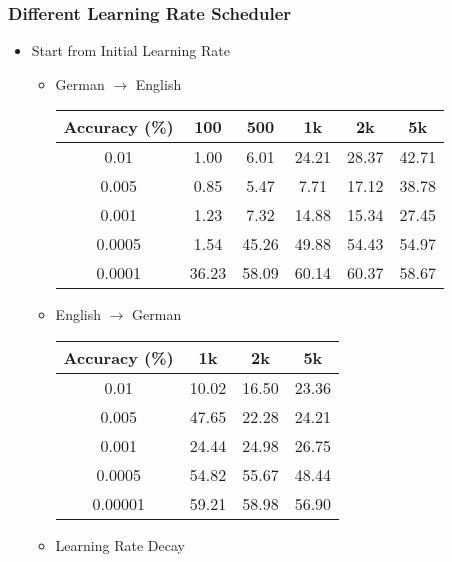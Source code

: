 \subsubsection{Different Learning Rate Scheduler}
\begin{itemize}
	\item Start from Initial Learning Rate
	\begin{itemize}
		\item German $\rightarrow$ English
		\begin{table}[H]
			\centering
			\begin{tabular}{cccccc}
				\hline
				Accuracy (\%) & 100   & 500   & 1k    & 2k    & 5k    \\ \hline
				0.01          & 1.00  & 6.01  & 24.21 & 28.37 & 42.71 \\ \hline
				0.005         & 0.85  & 5.47  & 7.71  & 17.12 & 38.78 \\ \hline
				0.001         & 1.23  & 7.32  & 14.88 & 15.34 & 27.45 \\ \hline
				0.0005        & 1.54  & 45.26 & 49.88 & 54.43 & 54.97 \\ \hline
				0.0001        & 36.23 & 58.09 & 60.14 & 60.37 & 58.67 \\ \hline
			\end{tabular}
		\end{table}
		\item English $\rightarrow$ German
		\begin{table}[H]
			\centering
			\begin{tabular}{cccc}
				\hline
				Accuracy (\%) & 1k   & 2k   & 5k      \\ \hline
				0.01          & 10.02  & 16.50  & 23.36 \\ \hline
				0.005       & 47.65 & 22.28 & 24.21 \\ \hline
				0.001        & 24.44 & 24.98 & 26.75 \\ \hline
				0.0005          & 54.82  & 55.67  & 48.44 \\ \hline
				0.00001        & 59.21 & 58.98 & 56.90 \\ \hline
			\end{tabular}
		\end{table}	
		\item 	Learning Rate Decay
		

\end{itemize}
\end{itemize}
